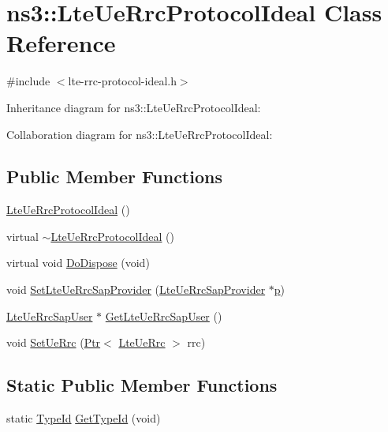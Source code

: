 \hypertarget{classns3_1_1LteUeRrcProtocolIdeal}{}\section{ns3\+:\+:Lte\+Ue\+Rrc\+Protocol\+Ideal Class Reference}
\label{classns3_1_1LteUeRrcProtocolIdeal}


{\ttfamily \#include $<$lte-\/rrc-\/protocol-\/ideal.\+h$>$}



Inheritance diagram for ns3\+:\+:Lte\+Ue\+Rrc\+Protocol\+Ideal\+:


Collaboration diagram for ns3\+:\+:Lte\+Ue\+Rrc\+Protocol\+Ideal\+:
\subsection*{Public Member Functions}
\begin{DoxyCompactItemize}
\item 
\hyperlink{classns3_1_1LteUeRrcProtocolIdeal_a0fc0ff42062ede8bb1a1853890ed0468}{Lte\+Ue\+Rrc\+Protocol\+Ideal} ()
\item 
virtual \hyperlink{classns3_1_1LteUeRrcProtocolIdeal_afa9bc82914203cba2466174a8a3ee466}{$\sim$\+Lte\+Ue\+Rrc\+Protocol\+Ideal} ()
\item 
virtual void \hyperlink{classns3_1_1LteUeRrcProtocolIdeal_a160be3a154df14418a5a75160d4691f5}{Do\+Dispose} (void)
\item 
void \hyperlink{classns3_1_1LteUeRrcProtocolIdeal_a838b56e76bfd258e5003ffe2f2e4e225}{Set\+Lte\+Ue\+Rrc\+Sap\+Provider} (\hyperlink{classns3_1_1LteUeRrcSapProvider}{Lte\+Ue\+Rrc\+Sap\+Provider} $\ast$\hyperlink{lte__link__budget__x2__handover__measures_8m_ac9de518908a968428863f829398a4e62}{p})
\item 
\hyperlink{classns3_1_1LteUeRrcSapUser}{Lte\+Ue\+Rrc\+Sap\+User} $\ast$ \hyperlink{classns3_1_1LteUeRrcProtocolIdeal_a9f6bc7e1b18abe7a81c6ec6b7614127c}{Get\+Lte\+Ue\+Rrc\+Sap\+User} ()
\item 
void \hyperlink{classns3_1_1LteUeRrcProtocolIdeal_a6f843f9883c187d15d085847ee15e832}{Set\+Ue\+Rrc} (\hyperlink{classns3_1_1Ptr}{Ptr}$<$ \hyperlink{classns3_1_1LteUeRrc}{Lte\+Ue\+Rrc} $>$ rrc)
\end{DoxyCompactItemize}
\subsection*{Static Public Member Functions}
\begin{DoxyCompactItemize}
\item 
static \hyperlink{classns3_1_1TypeId}{Type\+Id} \hyperlink{classns3_1_1LteUeRrcProtocolIdeal_a0a614c4b11039e3bfbba615a87c43a09}{Get\+Type\+Id} (void)
\end{DoxyCompactItemize}
